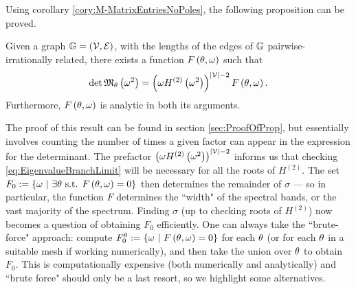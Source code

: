 Using corollary \ref{cory:M-MatrixEntriesNoPoles}, the following proposition can be proved.
\begin{prop} \label{prop:MMatrixDetForm}
	Given a graph $\mathbb{G} = \left( \mathcal{V}, \mathcal{E} \right)$, with the lengths of the edges of $\mathbb{G}$ pairwise-irrationally related, there exists a function $F\left( \theta,\omega \right)$ such that
	\begin{align} \label{eq:MMatrixDetForm}
		\det\mathfrak{M}_\theta\left( \omega^2 \right) = \left(  \omega H^{(2)}\left( \omega^2 \right)  \right)^{\left\lvert \mathcal{V} \right\rvert-2} F\left( \theta,\omega \right).
	\end{align}
	Furthermore, $F\left( \theta,\omega \right)$ is analytic in both its arguments.
\end{prop}
The proof of this result can be found in section \ref{sec:ProofOfProp}, but essentially involves counting the number of times a given factor can appear in the expression for the determinant.
The prefactor $\left(  \omega H^{(2)}\left( \omega^2 \right)  \right)^{\left\lvert \mathcal{V} \right\rvert-2}$ informs us that checking \eqref{eq:EigenvalueBranchLimit} will be necessary for all the roots of $H^{(2)}$.
The set $F_0 := \left\{ \omega \ \middle\vert \  \exists\theta \text{ s.t. }F\left( \theta, \omega \right)=0 \right\}$ then determines the remainder of $\sigma$ --- so in particular, the function $F$ determines the ``width" of the spectral bands, or the vast majority of the spectrum.
Finding $\sigma$ (up to checking roots of $H^{(2)}$) now becomes a question of obtaining $F_0$ efficiently.
One can always take the ``brute-force" approach: compute $F_0^{\theta} := \left\{ \omega \ \middle\vert \  F\left( \theta, \omega \right)=0 \right\}$ for each $\theta$ (or for each $\theta$ in a suitable mesh if working numerically), and then take the union over $\theta$ to obtain $F_0$.
This is computationally expensive (both numerically and analytically) and ``brute force" should only be a last resort, so we highlight some alternatives.

